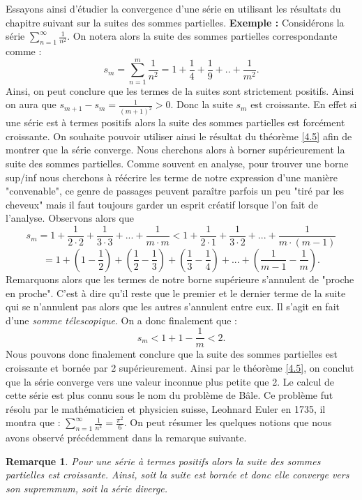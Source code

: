 \documentclass[a4paper, 12pt, french, twoside]{article}
\newtheorem{rem}[theorem]{Remarque}
\begin{document}
Essayons ainsi d'étudier la convergence d'une série en utilisant les résultats du chapitre suivant sur la suites des sommes partielles. \newline
\textbf{Exemple :} Considérons la série $\sum_{n=1}^{\infty} \frac{1}{n^2}$. On notera alors la suite des sommes partielles correspondante comme : $$ s_m = \sum_{n=1}^{m} \frac{1}{n^2} = 1 +  \frac{1}{4} + \frac{1}{9} + .. + \frac{1}{m^2}.$$
Ainsi, on peut conclure que les termes de la suites sont strictement positifs. Ainsi on aura que $s_{m+1} - s_m = \frac{1}{(m+1)^2} > 0$. Donc la suite $s_m$ est croissante. En effet si une série est à termes positifs alors la suite des sommes partielles est forcément croissante. On souhaite pouvoir utiliser ainsi le résultat du théorème \ref{4.5} afin de montrer que la série converge. Nous cherchons alors à borner supérieurement la suite des sommes partielles. Comme souvent en analyse, pour trouver une borne sup/inf nous cherchons à réécrire les terme de notre expression d'une manière "convenable", ce genre de passages peuvent paraître parfois un peu "tiré par les cheveux" mais il faut toujours garder un esprit créatif lorsque l'on fait de l'analyse. Observons alors que $$ s_m = 1 + \frac{1}{2\cdot2} + \frac{1}{3\cdot3} + ... + \frac{1}{m \cdot m} < 1 + \frac{1}{2\cdot1 } + \frac{1}{3\cdot2} + ... + \frac{1}{m \cdot (m-1)}$$
$$= 1 + \left ( 1 - \frac{1}{2} \right ) + \left ( \frac{1}{2} - \frac{1}{3} \right ) + \left ( \frac{1}{3} - \frac{1}{4} \right ) + ... + \left ( \frac{1}{m-1} - \frac{1}{m} \right ) .$$
Remarquons alors que les termes de notre borne supérieure s'annulent de "proche en proche". C'est à dire qu'il reste que le premier et le dernier terme de la suite qui se n'annulent pas alors que les autres s'annulent entre eux. Il s'agit en fait d'une \textit{somme télescopique}. On a donc finalement que : 
$$ s_m < 1+1-\frac{1}{m} < 2. $$ Nous pouvons donc finalement conclure que la suite des sommes partielles est croissante et bornée par 2 supérieurement. Ainsi par le théorème \ref{4.5}, on conclut que la série converge vers une valeur inconnue plus petite que 2. Le calcul de cette série est plus connu sous le nom du problème de Bâle. Ce problème fut résolu par le mathématicien et physicien suisse, Leohnard Euler en 1735, il montra que : $\sum_{n=1}^{\infty} \frac{1}{n^2} = \frac{\pi^2}{6}$. 
\newline 
On peut résumer les quelques notions que nous avons observé précédemment dans la remarque suivante.
\begin{rem}
 Pour une série à termes positifs alors la suite des sommes partielles est croissante. Ainsi, soit la suite est bornée et donc elle converge vers son supremmum, soit la série diverge.    
\end{rem}
\end{document}

